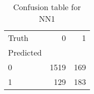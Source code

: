 \begin{table}[h!]
\caption{Confusion table for NN1}
\label{tab:NN1}
\begin{tabular}{lrr}
\toprule
Truth & 0 & 1 \\
Predicted &  &  \\
\midrule
0 & 1519 & 169 \\
1 & 129 & 183 \\
\bottomrule
\end{tabular}
\end{table}
